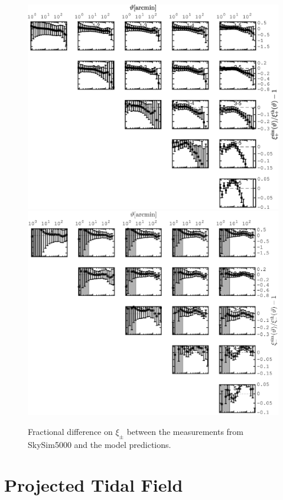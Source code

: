 \documentclass[useAMS,usenatbib]{mn2e}
\begin{document}
\begin{figure}
\includegraphics[width=\columnwidth]{graphs/xip_sims_vs_th.eps}
\includegraphics[width=\columnwidth]{graphs/xim_sims_vs_th.eps}
\caption{Fractional difference on $\xi_\pm$ between the measurements from SkySim5000 and the model predictions.  }
\label{fig:frac_err_sims_th}
\end{figure}

\section{Projected Tidal Field}
\label{app:2d_TT}
\end{document}
